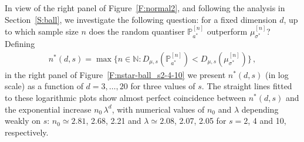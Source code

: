 \documentclass{article}
\def\NN{\mathds{N}}
\def\me{\epsilon}
\def\ml{\lambda}
\def\ms{\sigma}
\def\PP{\mathbb{P}}
\newcommand{\be}{\begin{eqnarray}}
\newcommand{\ee}{\end{eqnarray}}
\begin{document}

In view of the right panel of Figure~\ref{F:normal2}, and following the analysis in Section~\ref{S:ball}, we investigate the following question: for a fixed dimension $d$, up to which sample size $n$ does the random quantiser $\PP_{a^*}^{[n]}$ outperform $\mu_{\ms^*}^{[n]}$? Defining
\be\label{nstar}
n^*(d,s) = \max\{n\in\NN: D_{\mu,s}(\PP_{a^*}^{[n]}) < D_{\mu,s}(\mu^{[n]}_{\ms^*}) \} \,,
\ee
in the right panel of Figure~\ref{F:nstar-ball_s2-4-10}
we present $n^*(d,s)$ (in log scale) as a function of $d=3,\ldots,20$ for three values of $s$. The straight lines fitted to these logarithmic plots show almost perfect coincidence between $n^*(d,s)$ and the exponential increase $n_0\, \ml^d$, with numerical values of $n_0$ and $\ml$ depending weakly on $s$: $n_0 \simeq 2.81$, 2.68, 2.21 and $\ml \simeq 2.08$, 2.07, 2.05 for $s=2$, 4 and 10, respectively.

\end{document}

